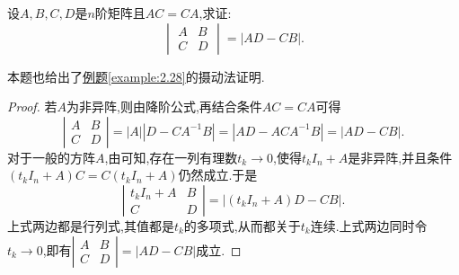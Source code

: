 \documentclass[../../main.tex]{subfiles}%
\begin{document}
\begin{example}
设\(A,B,C,D\)是\(n\)阶矩阵且\(AC = CA\),求证:
\[
\begin{vmatrix}
A & B\\
C & D
\end{vmatrix}=|AD - CB|.
\]
\end{example}
\begin{note}
本题也给出了\hyperref[example:2.28]{例题\ref{example:2.28}}的摄动法证明.
\end{note}
\begin{proof}
若\(A\)为非异阵,则由降阶公式,再结合条件\(AC = CA\)可得
\[
\left|\begin{matrix}
A & B\\
C & D
\end{matrix}\right| = |A|\left|D - CA^{-1}B\right| = \left|AD - ACA^{-1}B\right| = |AD - CB|.
\]
对于一般的方阵\(A\),由可知,存在一列有理数\(t_k\rightarrow 0\),使得\(t_kI_n + A\)是非异阵,并且条件\((t_kI_n + A)C = C(t_kI_n + A)\)仍然成立.于是
\[
\left|\begin{matrix}
t_kI_n + A & B\\
C & D
\end{matrix}\right| = \left|(t_kI_n + A)D - CB\right|.
\]
上式两边都是行列式,其值都是\(t_k\)的多项式,从而都关于\(t_k\)连续.上式两边同时令\(t_k\rightarrow 0\),即有\(\left|\begin{matrix}
A & B\\
C & D
\end{matrix}\right| = |AD - CB|\)成立.
\end{proof}
\end{document}

